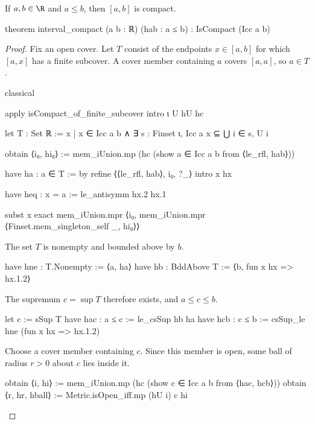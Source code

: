 \begin{lemma}
  \label{ma:lem:interval-compact}
  If $a,b\in\R$ and $a\leq b$, then $[a,b]$ is compact.

  \begin{lean}
    theorem interval_compact (a b : ℝ) (hab : a ≤ b) : IsCompact (Icc a b)
  \end{lean}
\end{lemma}

\begin{proof}
  Fix an open cover.
  Let $T$ consist of the endpoints $x\in[a,b]$ for which $[a,x]$ has a finite subcover.
  A cover member containing $a$ covers $[a,a]$, so $a\in T$.

  \begin{lean}
    classical

    apply isCompact_of_finite_subcover
    intro ι U hU hc

    let T : Set ℝ := {x | x ∈ Icc a b ∧ ∃ s : Finset ι, Icc a x ⊆ ⋃ i ∈ s, U i}

    obtain ⟨i₀, hi₀⟩ := mem_iUnion.mp (hc (show a ∈ Icc a b from ⟨le_rfl, hab⟩))

    have ha : a ∈ T := by
      refine ⟨⟨le_rfl, hab⟩, {i₀}, ?_⟩
      intro x hx

      have heq : x = a := le_antisymm hx.2 hx.1

      subst x
      exact mem_iUnion.mpr ⟨i₀, mem_iUnion.mpr ⟨Finset.mem_singleton_self _, hi₀⟩⟩
  \end{lean}

  The set $T$ is nonempty and bounded above by $b$.

  \begin{lean}
    have hne : T.Nonempty := ⟨a, ha⟩
    have hb : BddAbove T := ⟨b, fun x hx => hx.1.2⟩
  \end{lean}

  The supremum $c=\sup T$ therefore exists, and $a\leq c\leq b$.

  \begin{lean}
    let c := sSup T
    have hac : a ≤ c := le_csSup hb ha
    have hcb : c ≤ b := csSup_le hne (fun x hx => hx.1.2)
  \end{lean}

  Choose a cover member containing $c$.
  Since this member is open, some ball of radius $r>0$ about $c$ lies inside it.

  \begin{lean}
    obtain ⟨i, hi⟩ := mem_iUnion.mp (hc (show c ∈ Icc a b from ⟨hac, hcb⟩))
    obtain ⟨r, hr, hball⟩ := Metric.isOpen_iff.mp (hU i) c hi
  \end{lean}


\end{proof}
